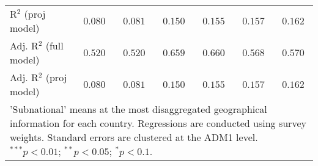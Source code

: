 \begin{table}[H]
\begin{center}
\begin{tabular}{l c c c c c c}
R$^2$ (proj model)      & $0.080$          & $0.081$         & $0.150$          & $0.155$        & $0.157$         & $0.162$        \\
Adj. R$^2$ (full model) & $0.520$          & $0.520$         & $0.659$          & $0.660$        & $0.568$         & $0.570$        \\
Adj. R$^2$ (proj model) & $0.080$          & $0.081$         & $0.150$          & $0.155$        & $0.157$         & $0.162$        \\
\hline
\multicolumn{7}{l}{\scriptsize{'Subnational' means at the most disaggregated geographical information for each country. Regressions are conducted using survey weights.
          Standard errors are clustered at the ADM1 level. $^{***}p<0.01$; $^{**}p<0.05$; $^{*}p<0.1$.}}
\end{tabular}
\label{si: tableS14}
\end{center}
\end{table}
